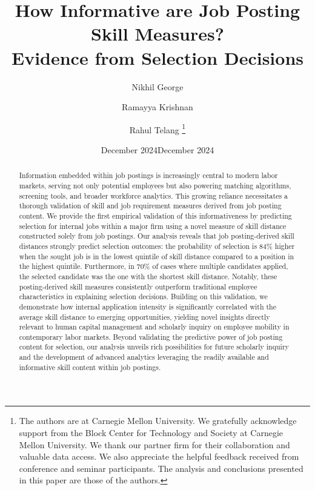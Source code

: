 \documentclass[letterpaper,11pt,leqno]{article}
\newcommand{\bib}{references.bib}
\begin{document}
\title{How Informative are Job Posting Skill Measures? \\ Evidence from Selection Decisions}

\ifanonymous
  \date{December 2024}
\else 
  \author{%
    Nikhil George \and Ramayya Krishnan \and Rahul Telang%
    \thanks{The authors are at Carnegie Mellon University. We gratefully acknowledge support from the Block Center for Technology and Society at Carnegie Mellon University. We thank our partner firm for their collaboration and valuable data access. We also appreciate the helpful feedback received from conference and seminar participants. The analysis and conclusions presented in this paper are those of the authors.}%
  }
  \date{December 2024}
\fi

\begin{titlepage}
\maketitle  %

\begin{abstract}
Information embedded within job postings is increasingly central to modern labor markets, serving not only potential employees but also powering
matching algorithms, screening tools, and broader workforce analytics. This growing reliance necessitates a thorough validation of skill and job requirement
measures derived from job posting content. We provide the first empirical validation of this informativeness by predicting selection for internal jobs within
a major firm using a novel measure of skill distance constructed solely from job postings. Our analysis reveals that job posting-derived skill distances
strongly predict selection outcomes: the probability of selection is 84\% higher when the sought job is in the lowest quintile of skill distance
compared to a position in the highest quintile. Furthermore, in 70\% of cases where multiple candidates applied, the selected candidate
was the one with the shortest skill distance. Notably, these posting-derived skill measures consistently outperform traditional employee
characteristics in explaining selection decisions. Building on this validation, we demonstrate how internal application intensity is
significantly correlated with the average skill distance to emerging opportunities, yielding novel insights directly relevant to
human capital management and scholarly inquiry on employee mobility in contemporary labor markets. Beyond validating the predictive power
of job posting content for selection, our analysis unveils rich possibilities for future scholarly inquiry and the development of
advanced analytics leveraging the readily available and informative skill content within job postings.
\end{abstract}

\end{titlepage}










\end{document}
